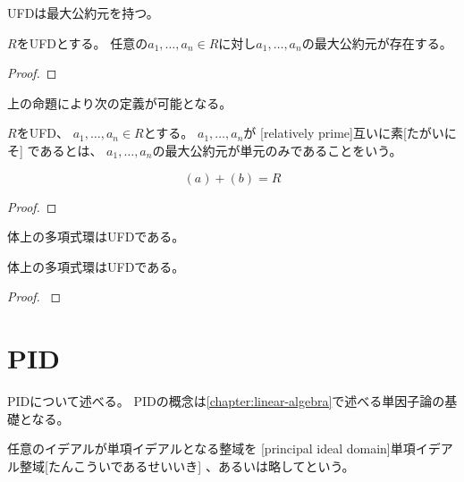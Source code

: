 \documentclass[report]{jlreq}
\begin{document}
UFDは最大公約元を持つ。

\begin{proposition}[UFDは最大公約元を持つ]
    $R$をUFDとする。
    任意の$a_1, \dots, a_n \in R$に対し$a_1, \dots, a_n$の最大公約元が存在する。
\end{proposition}

\begin{proof}
\end{proof}

上の命題により次の定義が可能となる。

\begin{definition}[互いに素]
    $R$をUFD、
    $a_1, \dots, a_n \in R$とする。
    $a_1, \dots, a_n$が
    [relatively prime]{互いに素}[たがいにそ]
    であるとは、
    $a_1, \dots, a_n$の最大公約元が単元のみであることをいう。
\end{definition}

\begin{proposition}[互いに素な元と互いに素なイデアル]
    \begin{equation}
        (a) + (b) = R
    \end{equation}
    \TODO{}
\end{proposition}

\begin{proof}
\end{proof}

体上の多項式環はUFDである。

\begin{theorem}
    体上の多項式環はUFDである。
\end{theorem}

\begin{proof}
    \cite[p.111]{Rot15}
\end{proof}

%
\section{PID}

PIDについて述べる。
PIDの概念は\cref{chapter:linear-algebra}で述べる単因子論の基礎となる。

\begin{definition}[PID]
    任意のイデアルが単項イデアルとなる整域を
    [principal ideal domain]{単項イデアル整域}[たんこういであるせいいき]
    、あるいは略してという。
\end{definition}
\end{document}
